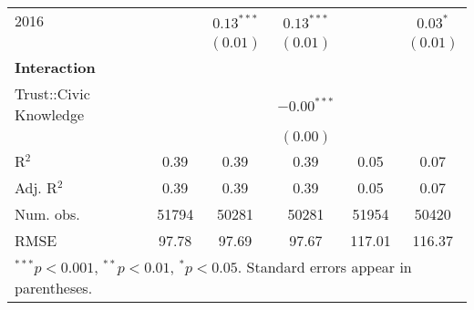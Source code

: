 \documentclass{article}
\begin{document}
\begin{landscape}
\begin{table}
\begin{center}
\begin{tabular}{l c c c c c }
2016                       &               & $0.13^{***}$    & $0.13^{***}$    &               & $0.03^{*}$    \\
                            &               & $(0.01)$        & $(0.01)$        &               & $(0.01)$      \\
\textbf{Interaction} &  &    &    &       &               \\
Trust::Civic Knowledge &               &                 & $-0.00^{***}$   &               &               \\
                            &               &                 & $(0.00)$        &               &               \\
\hline
R$^2$                       & 0.39          & 0.39            & 0.39            & 0.05          & 0.07          \\
Adj. R$^2$                  & 0.39          & 0.39            & 0.39            & 0.05          & 0.07          \\
Num. obs.                   & 51794         & 50281           & 50281           & 51954         & 50420         \\
RMSE                        & 97.78         & 97.69           & 97.67           & 117.01        & 116.37        \\
\hline
\multicolumn{6}{l}{\scriptsize{$^{***}p<0.001$, $^{**}p<0.01$, $^*p<0.05$. Standard errors appear in parentheses.}}
\end{tabular}
\label{table:coefficients}
\end{center}
\end{table}
\end{landscape}
\end{document}
